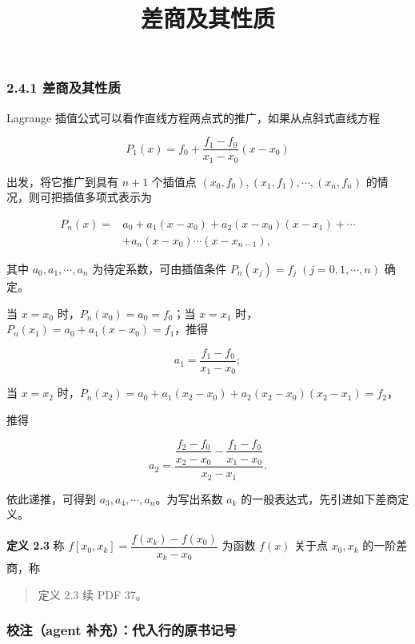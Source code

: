 \documentclass[
  10pt,
  fontset=fandol]{ctexart}
\title{差商及其性质}
\author{}
\date{}
\begin{document}
\maketitle

\subsubsection{2.4.1 差商及其性质}\label{ux5deeux5546ux53caux5176ux6027ux8d28}

Lagrange 插值公式可以看作直线方程两点式的推广，如果从点斜式直线方程

\[
P_1(x)=f_0+\frac{f_1-f_0}{x_1-x_0}(x-x_0)
\]

出发，将它推广到具有 \(n+1\) 个插值点 \((x_0,\allowbreak f_0),\allowbreak (x_1,\allowbreak f_1),\allowbreak \cdots,\allowbreak (x_n,\allowbreak f_n)\) 的情况，则可把插值多项式表示为

\[
\begin{aligned}
P_n(x)={}&a_0+a_1(x-x_0)+a_2(x-x_0)(x-x_1)+\cdots\\
&+a_n(x-x_0)\cdots(x-x_{n-1}),
\end{aligned}
\tag{2.4.1}
\]

其中 \(a_0,a_1,\cdots,a_n\) 为待定系数，可由插值条件 \(P_n(x_j)=f_j\;(j=0,1,\cdots,n)\) 确定。

当 \(x=x_0\) 时，\(P_n(x_0)=a_0=f_0\)；当 \(x=x_1\) 时，\(P_n(x_1)=a_0+a_1(x-x_0)=f_1\)，推得

\[
a_1=\frac{f_1-f_0}{x_1-x_0};
\]

当 \(x=x_2\) 时，\(P_n(x_2)=a_0+a_1(x_2-x_0)+a_2(x_2-x_0)(x_2-x_1)=f_2\)，

推得

\[
a_2=\frac{\dfrac{f_2-f_0}{x_2-x_0}-\dfrac{f_1-f_0}{x_1-x_0}}{x_2-x_1}.
\]

依此递推，可得到 \(a_3,a_4,\cdots,a_n\)。为写出系数 \(a_k\) 的一般表达式，先引进如下差商定义。

\textbf{定义 2.3} 称 \(f[x_0,x_k]=\dfrac{f(x_k)-f(x_0)}{x_k-x_0}\) 为函数 \(f(x)\) 关于点 \(x_0,x_k\) 的一阶差商，称

\begin{quote}
定义 2.3 续 PDF 37。
\end{quote}

\subsubsection{校注（agent 补充）：代入行的原书记号}\label{ux6821ux6ce8agent-ux8865ux5145ux4ee3ux5165ux884cux7684ux539fux4e66ux8bb0ux53f7}
\end{document}
